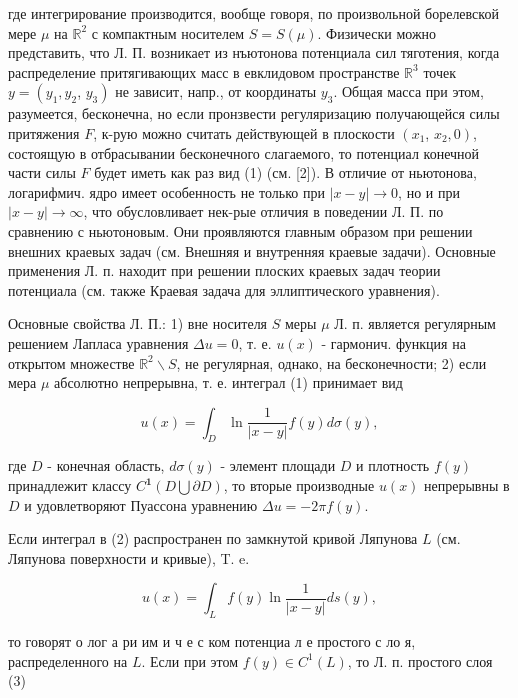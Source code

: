 \documentclass[10pt]{article}
\begin{document}
где интегрирование производится, вообще говоря, по произвольной борелевской мере $\mu$ на $\mathbb{R}^{2}$ с компактным носителем $S=S(\mu)$. Физически можно представить, что Л. П. возникает из нъютонова потенциала сил тяготения, когда распределение притягивающих масс в евклидовом пространстве $\mathbb{R}^{3}$ точек $y=\left(y_{1}, y_{2}\right.$, $\left.y_{3}\right)$ не зависит, напр., от координаты $y_{3}$. Общая масса при этом, разумеется, бесконечна, но если пронзвести регуляризацию получающейся силы притяжения $F$, к-рую можно считать действующей в плоскости $\left(x_{1}\right.$, $\left.x_{2}, 0\right)$, состоящую в отбрасывании бесконечного слагаемого, то потенциал конечной части силы $F$ будет иметь как раз вид (1) (см. [2]). В отличие от ньютонова, логарифмич. ядро имеет особенность не только при $|x-y| \rightarrow 0$, но и при $|x-y| \rightarrow \infty$, что обусловливает нек-рые отличия в поведении Л. П. по сравнению с ньютоновым. Они проявляются главным образом при решении внешних краевых задач (см. Внешняя $и$ внутренняя краевые задачи). Основные применения Л. п. находит при решении плоских краевых задач теории потенциала (см. также Краевая задача для эллиптического уравнения).



Основные свойства Л. П.: 1) вне носителя $S$ меры $\mu$ Л. п. является регулярным решением Лапласа уравнения $\Delta u=0$, т. е. $u(x)$ - гармонич. функция на открытом множестве $\mathbb{R}^{2} \backslash S$, не регулярная, однако, на бесконечности; 2) если мера $\mu$ абсолютно непрерывна, т. е. интеграл (1) принимает вид



\[

u(x)=\int_{D} \ln \frac{1}{|x-y|} f(y) d \sigma(y),

\]



где $D$ - конечная область, $d \sigma(y)$ - элемент площади $D$ и плотность $f(y)$ принадлежит классу $C^{\mathbf{1}}(D \bigcup \partial D)$, то вторые производные $u(x)$ непрерывны в $D$ и удовлетворяют Пуассона уравнению $\Delta u=-2 \pi f(y)$.



Если интеграл в (2) распространен по замкнутой кривой Ляпунова $L$ (см. Ляпунова поверхности и кривые), T. e.



\[

u(x)=\int_{L} f(y) \ln \frac{1}{|x-y|} d s(y),

\]



то говорят о лог а ри им и ч е с ком потенциа л е простого с ло я, распределенного на $L$. Если при этом $f(y) \in C^{1}(L)$, то Л. п. простого слоя (3)
\end{document}

